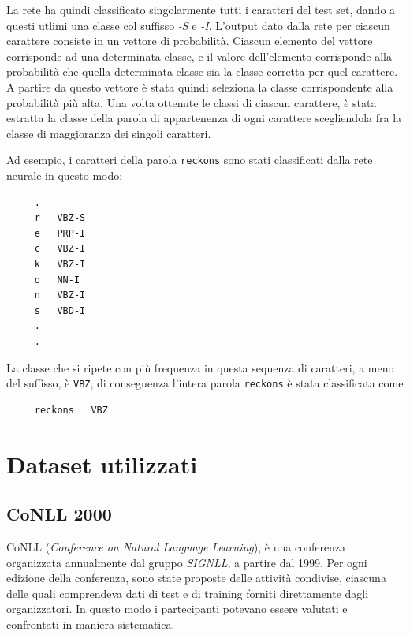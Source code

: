 La rete ha quindi classificato singolarmente tutti i caratteri del test set,
dando a questi utlimi una classe col suffisso \emph{-S} e \emph{-I}. L'output
dato dalla rete per ciascun carattere consiste in un vettore di probabilit\`a.
Ciascun elemento del vettore corrisponde ad una determinata classe, e il valore
dell'elemento corrisponde alla probabilit\`a che quella determinata classe sia la
classe corretta per quel carattere. A partire da questo vettore \`e stata quindi
seleziona la classe corrispondente alla probabilit\`a pi\`u alta. Una volta ottenute
le classi di ciascun carattere, \`e stata estratta la classe della parola di appartenenza
di ogni carattere scegliendola fra la classe di maggioranza dei singoli caratteri.

Ad esempio, i caratteri della parola \texttt{reckons} sono stati classificati
dalla rete neurale in questo modo:

\begin{center}
  \begin{minipage}{5cm}
    \begin{verbatim}
     .
     r   VBZ-S
     e   PRP-I
     c   VBZ-I
     k   VBZ-I
     o   NN-I
     n   VBZ-I
     s   VBD-I
     .
     .
    \end{verbatim}
  \end{minipage}
\end{center}

La classe che si ripete con pi\`u frequenza in questa sequenza di caratteri, a
meno del suffisso, \`e \texttt{VBZ}, di conseguenza l'intera parola \texttt{reckons}
\`e stata classificata come

\begin{center}
  \begin{minipage}{5cm}
    \begin{verbatim}
     reckons   VBZ
    \end{verbatim}
  \end{minipage}
\end{center}

\section{Dataset utilizzati}
\nocite{Zanchetta:2005}
\nocite{Attardi:2008}

\subsection{CoNLL 2000}
CoNLL (\emph{Conference on Natural Language Learning}), \`e una conferenza
organizzata annualmente dal gruppo \emph{SIGNLL}, a partire dal 1999. Per ogni
edizione della conferenza, sono state proposte delle attivit\`a condivise, ciascuna
delle quali comprendeva dati di test e di training forniti direttamente dagli
organizzatori. In questo modo i partecipanti potevano essere valutati e
confrontati in maniera sistematica.

